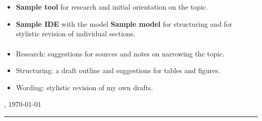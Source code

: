 \thispagestyle{empty}

\section*{\langaiusage}

\langaiusagetext

\paragraph{\langaiusageusedtools}
\begin{itemize}
    \item \textbf{Sample tool} for research and initial orientation on the topic.
    \item \textbf{Sample IDE} with the model \textbf{Sample model} for structuring and for stylistic revision of individual sections.
\end{itemize}

\paragraph{\langaiusageextent}
\begin{itemize}
    \item Research: suggestions for sources and notes on narrowing the topic.
    \item Structuring: a draft outline and suggestions for tables and figures.
    \item Wording: stylistic revision of my own drafts.
\end{itemize}

\vfill

\mysubmissionLocation, \today
\vspace{4em}

\rule{6cm}{0.4pt}\\
\myauthor
